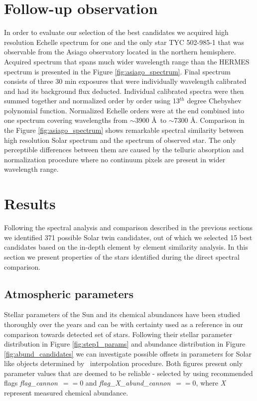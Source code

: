 \section{Follow-up observation}
In order to evaluate our selection of the best candidates we acquired high resolution Echelle spectrum for one and the only star TYC 502-985-1 that was observable from the Asiago observatory located in the northern hemisphere. Acquired spectrum that spans much wider wavelength range than the HERMES spectrum is presented in the Figure \ref{fig:asiago_spectrum}. Final spectrum consists of three 30 min exposures that were individually wavelength calibrated and had its background flux deducted. Individual  calibrated spectra were then summed together and normalized order by order using 13$^{th}$ degree Chebyshev polynomial function. Normalized Echelle orders were at the end combined into one spectrum covering wavelengths from $\sim$3900 \AA\ to $\sim$7300 \AA. Comparison in the Figure \ref{fig:asiago_spectrum} shows remarkable spectral similarity between high resolution Solar spectrum and the spectrum of observed star. The only perceptible differences between them are caused by the telluric absorption and normalization procedure   where no continuum pixels are present in wider wavelength range.

\section{Results}
\label{sec:res}
Following the spectral analysis and comparison described in the previous sections we identified 371 possible Solar twin candidates, out of which we selected 15 best candidates based on the in-depth element by element similarity analysis. In this section we present properties of the stars identified during the direct spectral comparison.

\subsection{Atmospheric parameters}
Stellar parameters of the Sun and its chemical abundances have been studied thoroughly over the years and can be with certainty used as a reference in our comparison towards detected set of stars. Following their stellar parameter distribution in Figure \ref{fig:step1_params} and abundance distribution in Figure \ref{fig:abund_candidates} we can investigate possible offsets in parameters for Solar like objects determined by \TC\ interpolation procedure. Both figures present only parameter values that are deemed to be reliable - selected by using recommended flags \textit{flag\_cannon}~$==0$ and \textit{flag\_X\_abund\_cannon}~$==0$, where \textit{X} represent measured chemical abundance.

